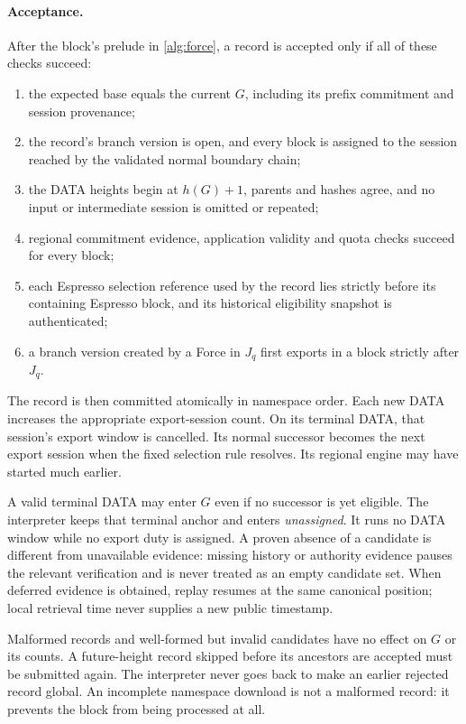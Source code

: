 \documentclass[11pt,a4paper]{article}
\newcommand{\defterm}[1]{\textcolor{rrBlue}{\textit{#1}}}
\begin{document}
\paragraph{Acceptance.}
After the block's prelude in \cref{alg:force}, a record is accepted
only if all of these checks succeed:
\begin{enumerate}[label=(\roman*)]
\item the expected base equals the current $G$, including its prefix
commitment and session provenance;
\item the record's branch version is open, and every block is assigned to the
session reached by the validated normal boundary chain;
\item the DATA heights begin at $h(G)+1$, parents and hashes agree,
and no input or intermediate session is omitted or repeated;
\item regional commitment evidence, application validity and quota
checks succeed for every block;
\item each Espresso selection reference used by the record lies
strictly before its containing Espresso block, and its historical
eligibility snapshot is authenticated;
\item a branch version created by a Force in $J_q$ first exports in a block
strictly after $J_q$.
\end{enumerate}
The record is then committed atomically in namespace order.
Each new DATA increases the appropriate export-session count. On its
terminal DATA, that session's export window is cancelled. Its normal
successor becomes the next export session when the fixed selection
rule resolves. Its regional engine may have started much earlier.

A valid terminal DATA may enter $G$ even if no successor is yet
eligible. The interpreter keeps that terminal anchor and enters
\defterm{unassigned}. It runs no DATA window while no export duty is
assigned. A proven absence of a candidate is different from unavailable
evidence: missing history or authority evidence pauses the relevant
verification and is never treated as an empty candidate set.
When deferred evidence is obtained, replay resumes at the same canonical
position; local retrieval time never supplies a new public timestamp.

Malformed records and well-formed but invalid candidates have no
effect on $G$ or its counts. A future-height record skipped before its
ancestors are accepted must be submitted again. The interpreter never
goes back to make an earlier rejected record global. An incomplete
namespace download is not a malformed record: it prevents the block
from being processed at all.
\end{document}
